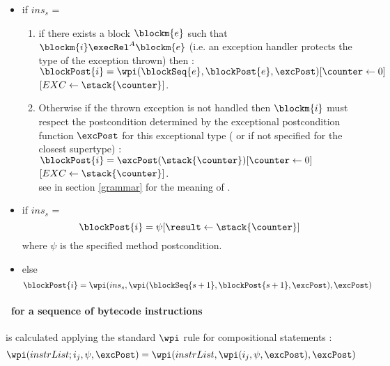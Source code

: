 \begin{defn}
\begin{itemize}
\item  if  $ins_s$ =   \\ 
	\begin{enumerate}
\item if there exists a block $\blockm{e}$ such that 
$\blockm{i} \execRel^A \blockm{e}$ (i.e. an exception handler protects the type of the exception thrown)
then :\\
$\blockPost{i }= \\ \wpi(\blockSeq{e}, \blockPost{e} ,\excPost)[\counter \leftarrow 0]$\\
\Myspace \Myspace \Myspace  \Myspace  \Myspace  \Myspace  \Myspace  $[EXC \leftarrow \stack{\counter}] $. \\
\item Otherwise if the thrown exception is not handled then $\blockm{i}$ must respect the postcondition determined by
the exceptional postcondition function $\excPost$ for this exceptional type ( or if not specified for the closest supertype) : \\ 
 $\blockPost{i }= \excPost(\stack{\counter}) [\counter \leftarrow 0] $
\Myspace \Myspace \Myspace \Myspace \Myspace  \Myspace  \Myspace  \Myspace  \Myspace  \Myspace $[EXC \leftarrow \stack{\counter}] $. \\
see in section \ref{grammar} for the meaning of .
    \end{enumerate}
\item  if  $ins_s$ =  \\
$$
   \blockPost{i } = \psi[\result \leftarrow \stack{\counter} ]    
$$
where $\psi $ is the specified method postcondition.
\item  else  
 $$ \blockPost{i} =  \wpi(  ins_s , \wpi( \blockSeq{s+1} ,  \blockPost{ s  +1}, \excPost) , \excPost)  $$ 
 \end{itemize}

\end{defn}

\paragraph{\wpi \ for a sequence of bytecode instructions} is calculated applying the standard $\wpi$ rule for compositional statements : 
$$ \wpi( instrList;i_{j}, \psi,\excPost ) =\wpi(instrList, \wpi(i_{j}, \psi,\excPost ),\excPost ) $$

